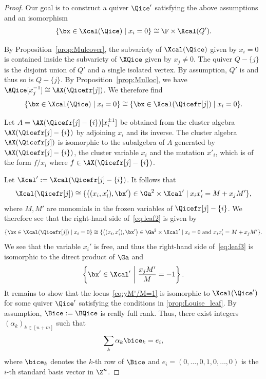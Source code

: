\begin{proof}%
Our goal is to construct a quiver $\Qice'$ satisfying the above assumptions and an isomorphism
\begin{equation}\label{eq:leaf1}
  \{\bx\in\Xcal(\Qice)\mid x_i=0\} \cong \F\times \Xcal(Q').
\end{equation}

  By Proposition~\ref{prop:Mulcover}, the subvariety of $\Xcal(\Qice)$ given by $x_i=0$ is contained inside the subvariety of $\XQice$ given by $x_j\neq0$. The quiver $Q-\{j\}$ is the disjoint union of $Q'$ and a single isolated vertex. By assumption, $Q'$ is \Louise and thus so is $Q-\{j\}$. By Proposition~\ref{prop:Mulloc}, we have $\AQice[x_j^{-1}]\cong \AX(\Qicefr[j])$. We therefore find
\begin{equation}\label{eq:leaf2}
    \{\bx\in\Xcal(\Qice)\mid x_i=0\} \cong \{\bx\in\Xcal(\Qicefr[j])\mid x_i=0\}.
\end{equation}

%
Let $A= \AX(\Qicefr[j] - \{i\})[x_i^{\pm 1}]$ be obtained from the cluster algebra $ \AX(\Qicefr[j] - \{i\})$ by adjoining $x_i$ and its inverse.  The cluster algebra $\AX(\Qicefr[j])$ is isomorphic 
%
 to the subalgebra of $A$ generated by $\AX(\Qicefr[j] - \{i\})$, the cluster variable $x_i$ and the mutation $x'_i$, which is of the form $f/x_i$ where $f \in \AX(\Qicefr[j] - \{i\})$.  

Let $\Xcal':=\Xcal(\Qicefr[j] - \{i\})$.  It follows that 
\begin{equation}\label{eq:leaf2.5}
  \Xcal(\Qicefr[j])\cong \{\left((x_i,x_i'),\bx'\right)\in\Ga^2\times\Xcal'\mid x_ix_i'=M+x_jM'\},
\end{equation}
where $M,M'$ are monomials in the frozen variables of $\Qicefr[j] - \{i\}$. We therefore see that the right-hand side of~\eqref{eq:leaf2} is given by 
\begin{equation}\label{eq:leaf3}
  \{\bx\in\Xcal(\Qicefr[j])\mid x_i=0\}
\cong \{\left((x_i,x_i'),\bx'\right)\in\Ga^2\times\Xcal'\mid x_i=0 \text{ and } x_ix_i'=M+x_jM'\}.
\end{equation}
We see that the variable $x_i'$ is free, and thus the right-hand side of~\eqref{eq:leaf3} is isomorphic to the direct product of $\Ga$ and 
\begin{equation} \label{eq:yM'/M=1} 
\left\{\bx'\in \Xcal'\ \middle|\  \frac{x_jM'}{M}=-1\right\}.
\end{equation}
%
%
%
%
%
%
%
%
%
%
%
%
%
%
%
  It remains to show that the locus~\eqref{eq:yM'/M=1} is isomorphic to $\Xcal(\Qice')$ for some quiver $\Qice'$ satisfying the conditions in \cref{prop:Louise_leaf}. By assumption, $\Bice:=\BQice$ is really full rank. Thus, there exist integers $(\alpha_k)_{k\in[n+m]}$ such that 
  \begin{equation*}%
    \sum_{k} \alpha_k \bice_k=e_i,
  \end{equation*}
where $\bice_k$ denotes the $k$-th row of $\Bice$ and $e_i=(0,\dots,0,1,0,\dots,0)$ is the $i$-th standard basis vector in $\Z^n$. 


\end{proof}
